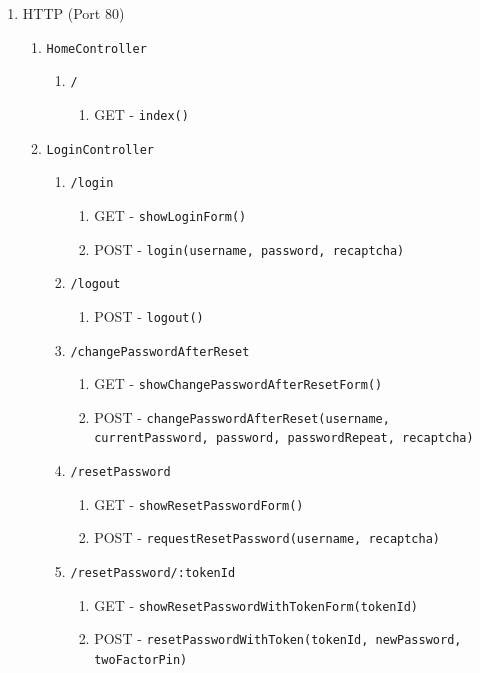 \documentclass[12pt,DIV14,BCOR10mm,a4paper,parskip=half-,headsepline,headinclude,english,ngerman,bibliography=totocnumbered]{scrreprt}
\begin{document}
\begin{enumerate}
  \item HTTP (Port 80)
  \begin{enumerate}
    \item \texttt{HomeController}
    \begin{enumerate}
     \item \texttt{/}
      \begin{enumerate}
        \item GET - \texttt{index()}
      \end{enumerate}
    \end{enumerate}

  \item \texttt{LoginController}
    \begin{enumerate}
     \item \texttt{/login}
      \begin{enumerate}
        \item GET - \texttt{showLoginForm()}
        \item POST - \texttt{login(username, password, recaptcha)}
      \end{enumerate}
      \item \texttt{/logout}
      \begin{enumerate}
        \item POST - \texttt{logout()}
      \end{enumerate}
      \item \texttt{/changePasswordAfterReset}
      \begin{enumerate}
        \item GET - \texttt{showChangePasswordAfterResetForm()}
        \item POST - \texttt{changePasswordAfterReset(username, currentPassword, password, passwordRepeat, recaptcha)}
      \end{enumerate}

      \item \texttt{/resetPassword}
      \begin{enumerate}
        \item GET - \texttt{showResetPasswordForm()}
        \item POST - \texttt{requestResetPassword(username, recaptcha)}
      \end{enumerate}

      \item \texttt{/resetPassword/:tokenId}
      \begin{enumerate}
        \item GET - \texttt{showResetPasswordWithTokenForm(tokenId)}
        \item POST - \texttt{resetPasswordWithToken(tokenId, newPassword,\\twoFactorPin)}
      \end{enumerate}
    \end{enumerate}


\end{enumerate}
\end{enumerate}
\end{document}
